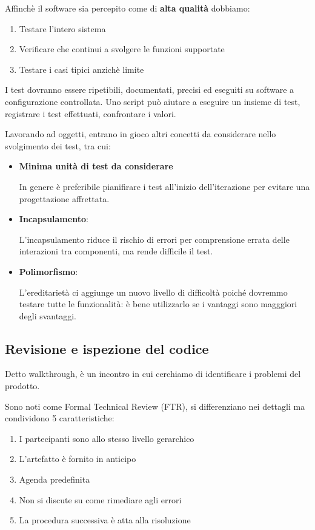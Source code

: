 \documentclass{report}
\begin{document}
\noindent
Affinchè il software sia percepito come di \textbf{alta qualità} dobbiamo:
\begin{enumerate}
    \item Testare l'intero sistema
    \item Verificare che continui a svolgere le funzioni supportate
    \item Testare i casi tipici anzichè limite
\end{enumerate}

\noindent
I test dovranno essere ripetibili, documentati, precisi ed eseguiti su software a configurazione controllata. Uno script può aiutare a eseguire un insieme di test, registrare i test effettuati, confrontare i valori.

\noindent
Lavorando ad oggetti, entrano in gioco altri concetti da considerare nello svolgimento dei test, tra cui:

\newpage
\begin{itemize}
    \item \textbf{Minima unità di test da considerare}

    \noindent
    In genere è preferibile pianifirare i test all'inizio dell'iterazione per evitare una progettazione affrettata.

    \item \textbf{Incapsulamento}:
    
    \noindent
    L'incapsulamento riduce il rischio di errori per comprensione errata delle interazioni tra componenti, ma rende difficile il test.

    \item \textbf{Polimorfismo}:
    
    \noindent
    L'ereditarietà ci aggiunge un nuovo livello di difficoltà poiché dovremmo testare tutte le funzionalità: è bene utilizzarlo se i vantaggi sono magggiori degli svantaggi.
\end{itemize}

\subsection*{Revisione e ispezione del codice}
Detto walkthrough, è un incontro in cui cerchiamo di identificare i problemi del prodotto.

\noindent
Sono noti come Formal Technical Review (FTR), si differenziano nei dettagli ma condividono 5 caratteristiche:
\begin{enumerate}
    \item I partecipanti sono allo stesso livello gerarchico
    \item L'artefatto è fornito in anticipo
    \item Agenda predefinita
    \item Non si discute su come rimediare agli errori
    \item La procedura successiva è atta alla risoluzione
\end{enumerate}
\end{document}
